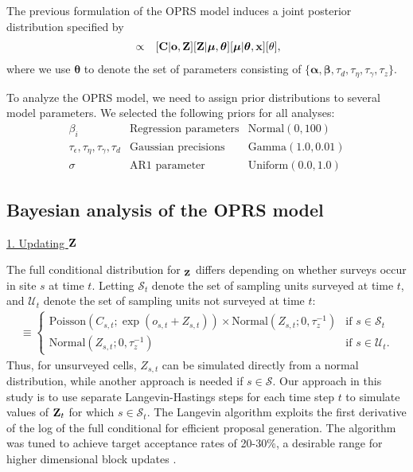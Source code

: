 \documentclass[12pt,fleqn]{article}
\begin{document}
\begin{flushleft}
\hspace{.5in}  The previous formulation of the OPRS model induces a joint posterior distribution specified by
\begin{eqnarray}
  [{\bf Z},\boldsymbol{\mu},\boldsymbol{\theta}| {\bf x},{\bf C},{\bf o}] & \propto & [{\bf C} | {\bf o}, {\bf Z}][{\bf Z} | \boldsymbol{\mu},\boldsymbol{\theta}] [\boldsymbol{\mu} | \boldsymbol{\theta},{\bf x}] [\theta],
  \label{eq:hmod}
\end{eqnarray}
where we use $\boldsymbol{\theta}$ to denote the set of parameters consisting of $ \{ \boldsymbol{\alpha},\boldsymbol{\beta},\tau_d,\tau_\eta,\tau_\gamma,\tau_z \}$.

\hspace{.5in}To analyze the OPRS model, we need to assign prior distributions to several model parameters.  We selected the following priors for all analyses:
\begin{eqnarray*}
  \beta_i & \textrm{Regression parameters} & \textrm{Normal}(0,100) \\
  \tau_\epsilon, \tau_\eta, \tau_\gamma, \tau_d  & \textrm{Gaussian precisions} & \textrm{Gamma}(1.0,0.01) \\
  \sigma & \textrm{AR1 parameter} & \textrm{Uniform}(0.0,1.0)
   \label{eq:priors}
\end{eqnarray*}



\subsection{Bayesian analysis of the OPRS model}


\underline{1. Updating ${\bf Z}$}

The full conditional distribution for ${\bf_Z}$ differs depending on whether surveys occur in site $s$ at time $t$. Letting $\mathcal{S}_t$ denote the set of sampling units surveyed at time $t$, and $\mathcal{U}_t$ denote the set of sampling units not surveyed at time $t$:
\begin{eqnarray*}
  [{\bf Z}|\cdot] \equiv \begin{cases}
                   \textrm{Poisson}(C_{s,t};\exp(o_{s,t} + Z_{s,t})) \times \textrm{Normal}(Z_{s,t}; 0,\tau_z^{-1}) & \textrm{if } s \in \mathcal{S}_t \\
                     \textrm{Normal}(Z_{s,t}; 0,\tau_z^{-1}) & \textrm{if } s \in \mathcal{U}_t.
                  \end{cases}
\end{eqnarray*}
Thus, for unsurveyed cells, $Z_{s,t}$ can be simulated directly from a normal distribution, while another approach
is needed if $s \in \mathcal{S}$.  Our approach in this study is to use separate Langevin-Hastings steps \citep[see e.g.][section 7.1.4]{GivensHoeting2005} for each
time step $t$ to simulate values of ${\bf Z}_t$ for which $s \in \mathcal{S}_t$.  The Langevin algorithm exploits the first derivative of the log of the full conditional for efficient proposal generation.  The algorithm was tuned to achieve target acceptance rates of 20-30\%, a desirable range for higher dimensional block updates \citep{GelmanEtAl2004}.


\end{flushleft}
\end{document}
